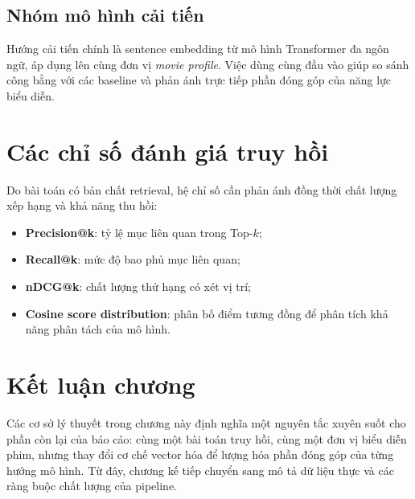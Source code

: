 \subsection{Nhóm mô hình cải tiến}
Hướng cải tiến chính là sentence embedding từ mô hình Transformer đa ngôn ngữ, áp dụng lên cùng đơn vị \textit{movie profile}. Việc dùng cùng đầu vào giúp so sánh công bằng với các baseline và phản ánh trực tiếp phần đóng góp của năng lực biểu diễn.

\section{Các chỉ số đánh giá truy hồi}
Do bài toán có bản chất retrieval, hệ chỉ số cần phản ánh đồng thời chất lượng xếp hạng và khả năng thu hồi:
\begin{itemize}
    \item \textbf{Precision@k}: tỷ lệ mục liên quan trong Top-$k$;
    \item \textbf{Recall@k}: mức độ bao phủ mục liên quan;
    \item \textbf{nDCG@k}: chất lượng thứ hạng có xét vị trí;
    \item \textbf{Cosine score distribution}: phân bố điểm tương đồng để phân tích khả năng phân tách của mô hình.
\end{itemize}

\section{Kết luận chương}
Các cơ sở lý thuyết trong chương này định nghĩa một nguyên tắc xuyên suốt cho phần còn lại của báo cáo: cùng một bài toán truy hồi, cùng một đơn vị biểu diễn phim, nhưng thay đổi cơ chế vector hóa để lượng hóa phần đóng góp của từng hướng mô hình. Từ đây, chương kế tiếp chuyển sang mô tả dữ liệu thực và các ràng buộc chất lượng của pipeline.
